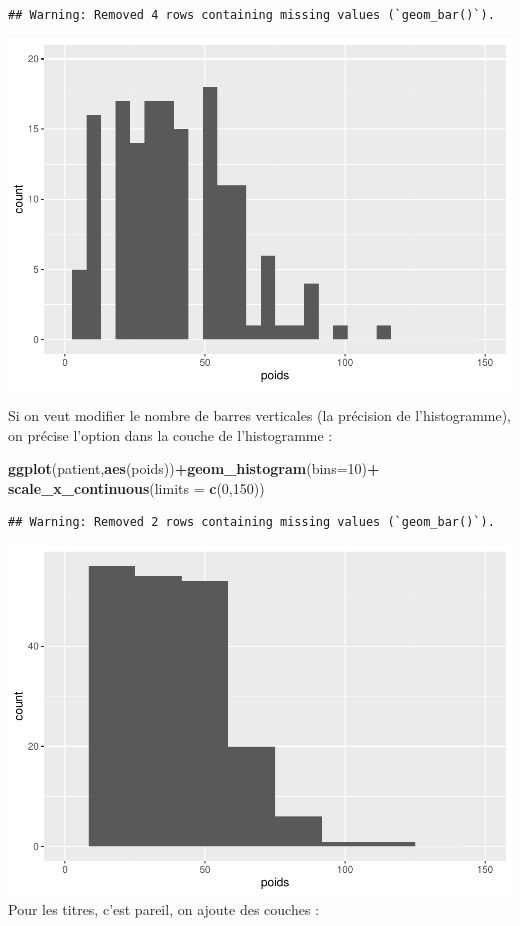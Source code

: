 \documentclass[
]{book}
\newenvironment{Shaded}{\begin{snugshade}}{\end{snugshade}}
\newcommand{\AttributeTok}[1]{\textcolor[rgb]{0.13,0.29,0.53}{#1}}
\newcommand{\DecValTok}[1]{\textcolor[rgb]{0.00,0.00,0.81}{#1}}
\newcommand{\FunctionTok}[1]{\textcolor[rgb]{0.13,0.29,0.53}{\textbf{#1}}}
\newcommand{\NormalTok}[1]{#1}
\newcommand{\SpecialCharTok}[1]{\textcolor[rgb]{0.81,0.36,0.00}{\textbf{#1}}}
\begin{document}
\begin{verbatim}
## Warning: Removed 4 rows containing missing values (`geom_bar()`).
\end{verbatim}

\includegraphics{_main_files/figure-latex/ggplot4-1.pdf}

Si on veut modifier le nombre de barres verticales (la précision de l'histogramme),
on précise l'option dans la couche de l'histogramme :

\begin{Shaded}
\begin{Highlighting}[]
\FunctionTok{ggplot}\NormalTok{(patient,}\FunctionTok{aes}\NormalTok{(poids))}\SpecialCharTok{+}\FunctionTok{geom\_histogram}\NormalTok{(}\AttributeTok{bins=}\DecValTok{10}\NormalTok{)}\SpecialCharTok{+}
  \FunctionTok{scale\_x\_continuous}\NormalTok{(}\AttributeTok{limits =} \FunctionTok{c}\NormalTok{(}\DecValTok{0}\NormalTok{,}\DecValTok{150}\NormalTok{))}
\end{Highlighting}
\end{Shaded}

\begin{verbatim}
## Warning: Removed 2 rows containing missing values (`geom_bar()`).
\end{verbatim}

\includegraphics{_main_files/figure-latex/ggplot5-1.pdf}
Pour les titres, c'est pareil, on ajoute des couches :
\end{document}
